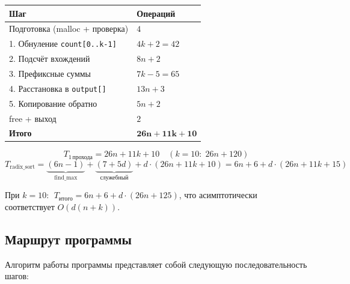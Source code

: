 \documentclass[a4paper,14pt]{extarticle}
\begin{document}
\begin{center}
\begin{tabular}{|l|l|}
\hline
\textbf{Шаг} & \textbf{Операций} \\
\hline
Подготовка (malloc + проверка) & $4$ \\
\hline
1. Обнуление \texttt{count[0..k-1]}  & $4k + 2 = 42$ \\
\hline
2. Подсчёт вхождений               & $8n + 2$ \\
\hline
3. Префиксные суммы                & $7k - 5 = 65$ \\
\hline
4. Расстановка в \texttt{output[]} & $13n + 3$ \\
\hline
5. Копирование обратно             & $5n + 2$ \\
\hline
free + выход                       & $2$ \\
\hline
\textbf{Итого}                     & $\mathbf{26n + 11k + 10}$ \\
\hline
\end{tabular}
\end{center}

\[
  T_{1\,\text{прохода}} = 26n + 11k + 10 \quad (k{=}10:\; 26n + 120)
\]
\[
  T_{\text{radix\_sort}} = \underbrace{(6n-1)}_{\text{find\_max}}
                         + \underbrace{(7+5d)}_{\text{служебный}}
                         + d\cdot(26n + 11k + 10)
                         = 6n + 6 + d\cdot(26n + 11k + 15)
\]

При $k = 10$: $\;T_{\text{итого}} = 6n + 6 + d\cdot(26n + 125)$, что асимптотически соответствует $O\!\left(d(n+k)\right)$.

\subsection{Маршрут программы}

Алгоритм работы программы представляет собой следующую последовательность шагов:
\end{document}
